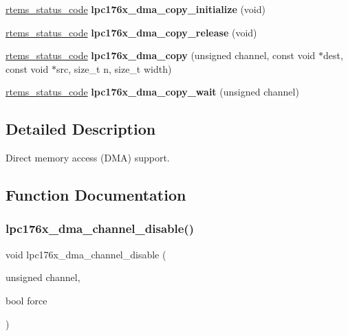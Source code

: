 \begin{DoxyCompactItemize}
\mbox{\hyperlink{group__ClassicStatus_ga545d41846817eaba6143d52ee4d9e9fe}{rtems\+\_\+status\+\_\+code}} {\bfseries lpc176x\+\_\+dma\+\_\+copy\+\_\+initialize} (void)
\item 
\mbox{\label{group__lpc176x__dma_ga4c38afe5c86c6d49cc2b2f72faf5a9d5}} 
\mbox{\hyperlink{group__ClassicStatus_ga545d41846817eaba6143d52ee4d9e9fe}{rtems\+\_\+status\+\_\+code}} {\bfseries lpc176x\+\_\+dma\+\_\+copy\+\_\+release} (void)
\item 
\mbox{\label{group__lpc176x__dma_gac69f76bc1e4249a6c5532b3b5e48b573}} 
\mbox{\hyperlink{group__ClassicStatus_ga545d41846817eaba6143d52ee4d9e9fe}{rtems\+\_\+status\+\_\+code}} {\bfseries lpc176x\+\_\+dma\+\_\+copy} (unsigned channel, const void $\ast$dest, const void $\ast$src, size\+\_\+t n, size\+\_\+t width)
\item 
\mbox{\label{group__lpc176x__dma_ga800bf5f828a9d89066b34b9b5539c24c}} 
\mbox{\hyperlink{group__ClassicStatus_ga545d41846817eaba6143d52ee4d9e9fe}{rtems\+\_\+status\+\_\+code}} {\bfseries lpc176x\+\_\+dma\+\_\+copy\+\_\+wait} (unsigned channel)
\end{DoxyCompactItemize}


\subsection{Detailed Description}
Direct memory access (D\+MA) support. 



\subsection{Function Documentation}
\mbox{\label{group__lpc176x__dma_ga9733b723623ac327f3ead7ec4d563309}} 
\subsubsection{\texorpdfstring{lpc176x\_dma\_channel\_disable()}{lpc176x\_dma\_channel\_disable()}}
{\footnotesize\ttfamily void lpc176x\+\_\+dma\+\_\+channel\+\_\+disable (\begin{DoxyParamCaption}\item[{unsigned}]{channel,  }\item[{bool}]{force }\end{DoxyParamCaption})}




